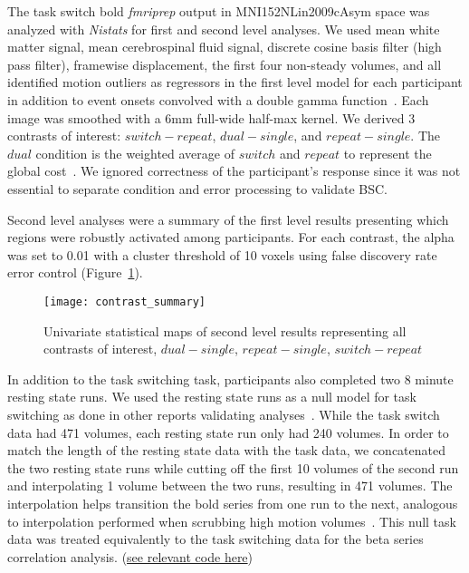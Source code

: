 \documentclass[phd,appendix,figures]{uithesis}
\begin{document}
The task switch bold \emph{fmriprep} output in MNI152NLin2009cAsym space
was analyzed with \emph{Nistats} for first and second level analyses.
We used mean white matter signal, mean cerebrospinal fluid signal,
discrete cosine basis filter (high pass filter), framewise displacement, the first four non-steady volumes, and
all identified motion outliers as regressors in the first level model for each participant
in addition to event onsets convolved with a double gamma function~\cite{Glover1999}.
Each image was smoothed with a 6mm full-wide half-max kernel.
We derived 3 contrasts of interest: $switch - repeat$, $dual- single$, and $repeat - single$.
The $dual$ condition is the weighted average of $switch$ and $repeat$ to represent the global cost~\cite{Wylie2000}.
We ignored correctness of the participant's response since it was not essential to
separate condition and error processing to validate BSC.

Second level analyses were a summary of the first level results presenting which
regions were robustly activated among participants.
For each contrast, the alpha was set to 0.01 with a cluster threshold of 10 voxels using
false discovery rate error control (Figure~\ref{fig:stat_maps}).

\begin{figure}[H]
  \centering
  \texttt{[image: contrast\_summary]}
  \caption[Univariate statisitcal maps]{
    Univariate statistical maps of second level results representing
    all contrasts of interest, $dual - single$, $repeat - single$, $switch - repeat$}
  \label{fig:stat_maps}
\end{figure}

In addition to the task switching task, participants also completed
two 8 minute resting state runs.
We used the resting state runs as a null model for task switching as done
in other reports validating analyses~\cite{Eklund2016,Olszowy2019}.
While the task switch data had 471 volumes, each resting state run only had
240 volumes.
In order to match the length of the resting state data with the task data, we concatenated
the two resting state runs while cutting off the first 10 volumes of the second run
and interpolating 1 volume between the two runs, resulting in 471 volumes.
The interpolation helps transition the bold series from one run to the next,
analogous to interpolation performed when scrubbing high motion volumes~\cite{Power2014a}. 
This null task data was treated equivalently to the task switching data for the
beta series correlation analysis.
(\href{https://github.com/jdkent/validateBetaSeries/tree/195ad5b4201971038dbbf8f73a3c537caf032743}{see relevant code here})
\end{document}
